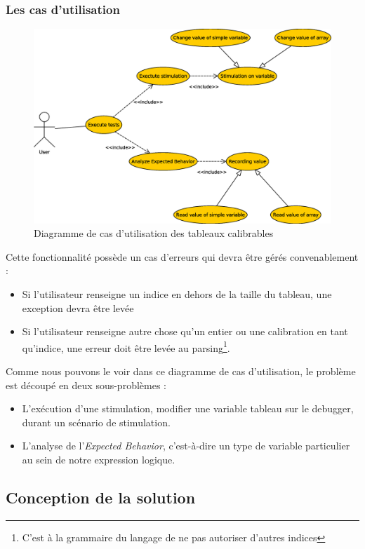 \subsubsection{Les cas d'utilisation}
\begin{figure}[H]
\centering
\includegraphics[width=18cm]{contents/images/usecasearray.eps}
\caption{Diagramme de cas d'utilisation des tableaux calibrables}
\end{figure}
\begin{remarque}
Cette fonctionnalité possède un cas d'erreurs qui devra être gérés convenablement : 
\begin{itemize}
\item Si l'utilisateur renseigne un indice en dehors de la taille du tableau, une exception devra être levée
\item Si l'utilisateur renseigne autre chose qu'un entier ou une calibration en tant qu'indice, une erreur doit être levée au parsing\footnote{C'est à la grammaire du langage de ne pas autoriser d'autres indices}.
 \end{itemize}
 \end{remarque}
 
 Comme nous pouvons le voir dans ce diagramme de cas d'utilisation, le problème est découpé en deux sous-problèmes : 
 \begin{itemize}
 	\item L'exécution d'une stimulation, modifier une variable tableau sur le debugger, durant un scénario de stimulation.
 	\item L'analyse de l'\textit{Expected Behavior}, c'est-à-dire un type de variable particulier au sein de notre expression logique.
 \end{itemize}
\subsection{Conception de la solution}
